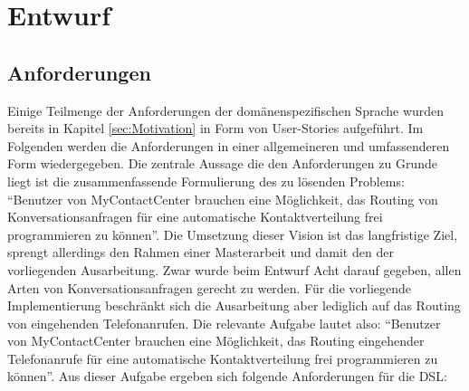 \chapter{Entwurf}

\section{Anforderungen}
Einige Teilmenge der Anforderungen der domänenspezifischen Sprache wurden bereits in Kapitel \ref{sec:Motivation} in Form von User-Stories aufgeführt. Im Folgenden werden die Anforderungen in einer allgemeineren und umfassenderen Form wiedergegeben. Die zentrale Aussage die den Anforderungen zu Grunde liegt ist die zusammenfassende Formulierung des zu lösenden Problems: ``Benutzer von MyContactCenter brauchen eine Möglichkeit, das Routing von Konversationsanfragen für eine automatische Kontaktverteilung frei programmieren zu können''. Die Umsetzung dieser Vision ist das langfristige Ziel, sprengt allerdings den Rahmen einer Masterarbeit und damit den der vorliegenden Ausarbeitung. Zwar wurde beim Entwurf Acht darauf gegeben, allen Arten von Konversationsanfragen gerecht zu werden. Für die vorliegende Implementierung beschränkt sich die Ausarbeitung aber lediglich auf das Routing von eingehenden Telefonanrufen. Die relevante Aufgabe lautet also: ``Benutzer von MyContactCenter brauchen eine Möglichkeit, das Routing eingehender Telefonanrufe für eine automatische Kontaktverteilung frei programmieren zu können''.
\newline
Aus dieser Aufgabe ergeben sich folgende Anforderungen für die DSL:

